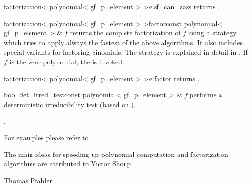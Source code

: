 \begin{cfcode}{factorization< polynomial< gf_p_element > >}{$a$.sf_can_zass}{}
  returns .
\end{cfcode}



\begin{fcode}{factorization< polynomial< gf_p_element > >}{factor}{const polynomial<
    gf_p_element > & $f$}%
  returns the complete factorization of $f$ using a strategy which tries to apply always the
  fastest of the above algorithms.  It also includes special variants for factoring binomials.
  The strategy is explained in detail in \cite{Pfahler_Thesis:1998}.  If $f$ is the zero
  polynomial, the \LEH is invoked.
\end{fcode}

\begin{cfcode}{factorization< polynomial< gf_p_element > >}{$a$.factor}{}
  returns .
\end{cfcode}


\begin{fcode}{bool }{det_irred_test}{const polynomial< gf_p_element > & $f$}
  performs a deterministic irreducibility test (based on ).
\end{fcode}



\SEEALSO

, 



\EXAMPLES

For examples please refer to
.



\NOTES

The main ideas for speeding up polynomial computation and factorization
algorithms are attributed to Victor Shoup \cite{Shoup:1995}



\AUTHOR

Thomas Pfahler
